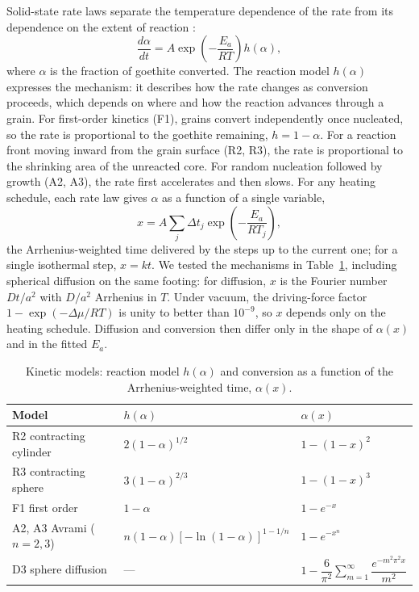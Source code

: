 Solid-state rate laws separate the temperature dependence of the rate from its dependence on
the extent of reaction \citep{vyazovkin2011}:
\begin{equation}
  \frac{d\alpha}{dt} = A\exp\!\left(-\frac{E_a}{RT}\right)h(\alpha),
\end{equation}
where $\alpha$ is the fraction of goethite converted. The reaction model $h(\alpha)$ expresses the
mechanism: it describes how the rate changes as conversion proceeds, which depends on where
and how the reaction advances through a grain. For first-order kinetics (F1), grains convert
independently once nucleated, so the rate is proportional to the goethite remaining,
$h = 1-\alpha$. For a reaction front moving inward from the grain surface (R2, R3), the rate is
proportional to the shrinking area of the unreacted core. For random nucleation followed by growth
(A2, A3), the rate first accelerates and then slows. For any heating schedule, each rate law
gives $\alpha$ as a function of a single variable,
\begin{equation}
  x = A\sum_j \Delta t_j\exp\!\left(-\frac{E_a}{RT_j}\right),
\end{equation}
the Arrhenius-weighted time delivered by the steps up to the current one; for a single isothermal
step, $x = kt$. We tested the mechanisms in Table~\ref{tab:gt_mech_forms}, including spherical
diffusion on the same footing: for diffusion, $x$ is the Fourier number $Dt/a^2$ with $D/a^2$
Arrhenius in $T$. Under vacuum, the driving-force factor $1-\exp(-\Delta\mu/RT)$ is unity to better
than $10^{-9}$, so $x$ depends only on the heating schedule. Diffusion and conversion then differ
only in the shape of $\alpha(x)$ and in the fitted $E_a$.

\begin{table}[htbp]
  \centering
  \caption{Kinetic models: reaction model $h(\alpha)$ and conversion as a function of the Arrhenius-weighted time, $\alpha(x)$.}
  \label{tab:gt_mech_forms}
  \footnotesize
  \setlength{\tabcolsep}{4pt}
  \begin{tabular}{lll}
    \hline
    Model & $h(\alpha)$ & $\alpha(x)$ \\
    \hline
    R2 contracting cylinder & $2(1-\alpha)^{1/2}$ & $1-(1-x)^2$ \\
    R3 contracting sphere & $3(1-\alpha)^{2/3}$ & $1-(1-x)^3$ \\
    F1 first order & $1-\alpha$ & $1-e^{-x}$ \\
    A2, A3 Avrami ($n=2,3$) & $n(1-\alpha)[-\ln(1-\alpha)]^{1-1/n}$ & $1-e^{-x^n}$ \\
    D3 sphere diffusion & --- & $1-\dfrac{6}{\pi^2}\displaystyle\sum_{m=1}^{\infty} \dfrac{e^{-m^2\pi^2 x}}{m^2}$ \\
    \hline
  \end{tabular}
\end{table}

